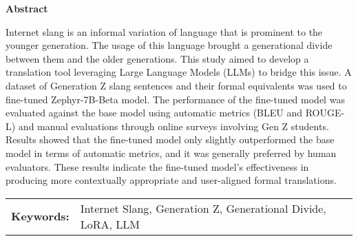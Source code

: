\begin{center}
\textbf{Abstract}
\end{center}
\setlength{\parindent}{0pt}
Internet slang is an informal variation of language that is prominent to the younger generation. The usage of this language brought a generational divide between them and the older generations. This study aimed to develop a translation tool leveraging Large Language Models (LLMs) to bridge this issue. A dataset of Generation Z slang sentences and their formal equivalents was used to fine-tuned Zephyr-7B-Beta model. The performance of the fine-tuned model was evaluated against the base model using automatic metrics (BLEU and ROUGE-L) and manual evaluations through online surveys involving Gen Z students. Results showed that the fine-tuned model only slightly outperformed the base model in terms of automatic metrics, and it was generally preferred by human evaluators. These results indicate the fine-tuned model's effectiveness in producing more contextually appropriate and user-aligned formal translations.

\begin{tabular}{lp{4.25in}}
\hspace{-0.5em}\textbf{Keywords:}\hspace{0.25em} & Internet Slang, Generation Z, Generational Divide, LoRA, LLM \\
\end{tabular}

